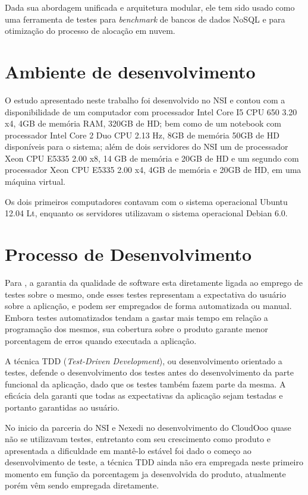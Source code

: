 Dada sua abordagem unificada e arquitetura modular, ele tem sido usado como uma ferramenta de testes para \textit{benchmark} de bancos de dados NoSQL e para otimização do processo de alocação em nuvem.


\section{Ambiente de desenvolvimento}
\label{computadores}

O estudo apresentado neste trabalho foi desenvolvido no NSI e contou com a disponibilidade de um computador com processador Intel Core I5 CPU 650 3.20 x4, 4GB de memória RAM, 320GB de HD; bem como de um notebook com processador Intel Core 2 Duo CPU 2.13 Hz, 8GB de memória 50GB de HD disponíveis para o sistema; além de dois servidores do NSI um de processador Xeon CPU E5335 2.00 x8, 14 GB de memória e 20GB de HD e um segundo com processador Xeon CPU E5335 2.00 x4, 4GB de memória e 20GB de HD, em uma máquina virtual.

Os dois primeiros computadores contavam com o sistema operacional Ubuntu 12.04 Lt, enquanto os servidores utilizavam o sistema operacional Debian 6.0.


\section{Processo de Desenvolvimento}

Para , a garantia da qualidade de software esta diretamente ligada ao emprego de testes sobre o mesmo, onde esses testes representam a expectativa do usuário sobre a aplicação, e podem ser empregados de forma automatizada ou manual. Embora testes automatizados tendam a gastar mais tempo em relação a programação dos mesmos, sua cobertura sobre o produto garante menor porcentagem de erros quando executada a aplicação.

A técnica TDD (\textit{Test-Driven Development}), ou desenvolvimento orientado a testes, defende o desenvolvimento dos testes antes do desenvolvimento da parte funcional da aplicação, dado que os testes também fazem parte da mesma. A eficácia dela garanti que todas as expectativas da aplicação sejam testadas e portanto garantidas ao usuário.

No inicio da parceria do NSI e Nexedi no desenvolvimento do CloudOoo quase não se utilizavam testes, entretanto com seu crescimento como produto e apresentada a dificuldade em mantê-lo estável foi dado o começo ao desenvolvimento de teste, a técnica TDD ainda não era empregada neste primeiro momento em função da porcentagem ja desenvolvida do produto, atualmente porém vêm sendo empregada diretamente.

